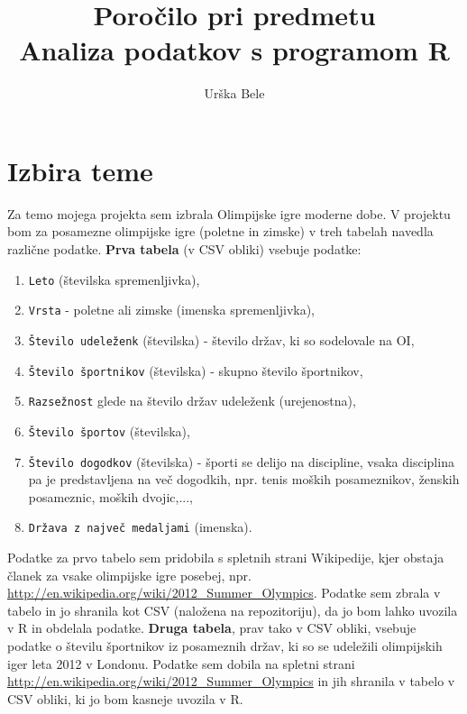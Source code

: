 \documentclass[11pt,a4paper]{article}
\begin{document}
\title{Poročilo pri predmetu \\
Analiza podatkov s programom R}
\author{Urška Bele}
\maketitle

\section{Izbira teme}

Za temo mojega projekta sem izbrala Olimpijske igre moderne dobe.
V projektu bom za posamezne olimpijske igre (poletne in zimske) v treh tabelah navedla različne podatke. \newline
\textbf{Prva tabela} (v CSV obliki) vsebuje podatke:
\begin{enumerate}
\item{\verb|Leto| (številska spremenljivka),}
\item{\verb|Vrsta| - poletne ali zimske (imenska spremenljivka),}
\item{ \verb|Število udeleženk| (številska) - število držav, ki so sodelovale na OI,}
\item{\verb|Število športnikov| (številska) - skupno število športnikov,}
\item{\verb|Razsežnost| glede na število držav udeleženk (urejenostna),}
\item{\verb|Število športov| (številska),}
\item{\verb|Število dogodkov| (številska) - športi se delijo na discipline, vsaka disciplina pa je predstavljena na več dogodkih, npr. tenis moških posameznikov, ženskih posameznic, moških dvojic,...,}
\item{\verb|Država z največ medaljami| (imenska).}
\end{enumerate}
Podatke za prvo tabelo sem pridobila s spletnih strani
 Wikipedije, kjer obstaja članek za vsake olimpijske igre posebej, npr.
\url{http://en.wikipedia.org/wiki/2012_Summer_Olympics}. 
 Podatke sem zbrala v tabelo in jo shranila kot CSV (naložena na repozitoriju), da jo bom lahko uvozila v R 
 in obdelala podatke.
\newline
\textbf{Druga tabela}, prav tako v CSV obliki, vsebuje podatke o številu športnikov iz posameznih držav, ki so se udeležili 
olimpijskih iger leta 2012 v Londonu. Podatke sem dobila na spletni strani \url{http://en.wikipedia.org/wiki/2012_Summer_Olympics} in jih shranila v tabelo v CSV obliki, ki jo bom kasneje uvozila v R.
\newline
\end{document}

